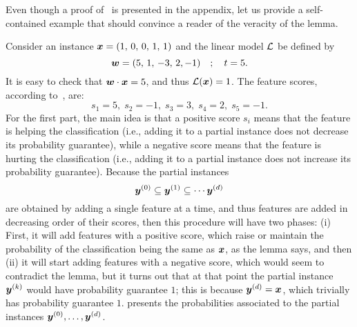 Even though a proof of~ is presented in the appendix, let us provide a self-contained example that should convince a reader of the veracity of the lemma.
\begin{example}\label{ex:greedy}
 Consider an instance ${\bm{x}} = (1,\, 0, \, 0, \, 1, \, 1)$ and the linear model $\mathcal{L}$ be defined by 
 \[ 
    {\bm{w}} = (5, \, 1, \, -3,\, 2, -1) \quad ; \quad t = 5.
 \]
 It is easy to check that ${\bm{w}} \cdot {\bm{x}} = 5$, and thus $\mathcal{L}({\bm{x}}) = 1$. The feature scores, according to~, are:
 \[
  s_1 = 5, \; s_2 = -1, \; s_3 = 3, \; s_4 = 2, \; s_5 = -1.
 \]
For the first part, the main idea is that a positive score $s_i$ means that the feature is helping the classification (i.e., adding it to a partial instance does not decrease its probability guarantee), while a negative score means that the feature is hurting the classification (i.e., adding it to a partial instance does not increase its probability guarantee). 
Because the partial instances 
\[ {\bm{y}}^{(0)} \subseteq {\bm{y}}^{(1)} \subseteq \cdots {\bm{y}}^{(d)}
\] 
are obtained by adding a single feature at a time, and thus features are added in decreasing order of their scores, then this procedure will have two phases: (i) First, it will add features with a positive score, which raise or maintain the probability of the classification being the same as ${\bm{x}}$, as the lemma says, and then (ii) it will start adding features with a negative score, which would seem to contradict the lemma, but it turns out that at that point the partial instance ${\bm{y}}^{(k)}$ would have probability guarantee $1$; this is because ${\bm{y}}^{(d)} = {\bm{x}}$, which trivially has probability guarantee $1$.
 presents the probabilities associated to the partial instances ${\bm{y}}^{(0)}, \ldots, {\bm{y}}^{(d)}$.


\end{example}

